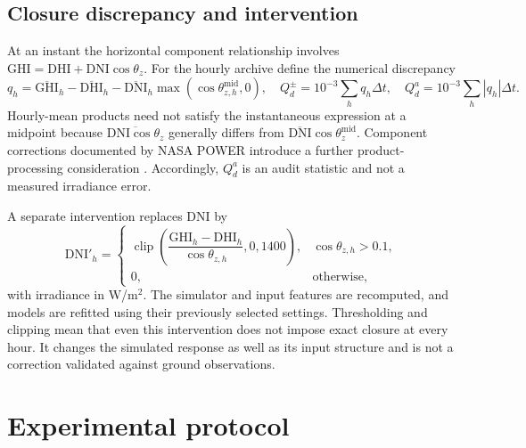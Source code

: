 \documentclass[11pt,a4paper]{article}
\begin{document}
\subsection{Closure discrepancy and intervention}
At an instant the horizontal component relationship involves $\mathrm{GHI}=\mathrm{DHI}+\mathrm{DNI}\cos\theta_z$. For the hourly archive define the numerical discrepancy
\begin{equation}
 q_h=\overline{\mathrm{GHI}}_h-\overline{\mathrm{DHI}}_h-
 \overline{\mathrm{DNI}}_h\max(\cos\theta_{z,h}^{\mathrm{mid}},0),\quad
 Q_d^{\pm}=10^{-3}\sum_h q_h\Delta t,\quad Q_d^{a}=10^{-3}\sum_h|q_h|\Delta t.
 \label{eq:closure}
\end{equation}
Hourly-mean products need not satisfy the instantaneous expression at a midpoint because $\overline{\mathrm{DNI}\cos\theta_z}$ generally differs from $\overline{\mathrm{DNI}}\cos\theta_z^{\mathrm{mid}}$. Component corrections documented by NASA POWER introduce a further product-processing consideration \cite{powercomponents}. Accordingly, $Q_d^{a}$ is an audit statistic and not a measured irradiance error.

A separate intervention replaces DNI by
\begin{equation}
 \mathrm{DNI}'_h=\begin{cases}
 \operatorname{clip}\!\left(\dfrac{\mathrm{GHI}_h-\mathrm{DHI}_h}{\cos\theta_{z,h}},0,1400\right),&\cos\theta_{z,h}>0.1,\\
 0,&\text{otherwise},
 \end{cases}\label{eq:intervention}
\end{equation}
with irradiance in W/m$^2$. The simulator and input features are recomputed, and models are refitted using their previously selected settings. Thresholding and clipping mean that even this intervention does not impose exact closure at every hour. It changes the simulated response as well as its input structure and is not a correction validated against ground observations.

\section{Experimental protocol}
\end{document}
